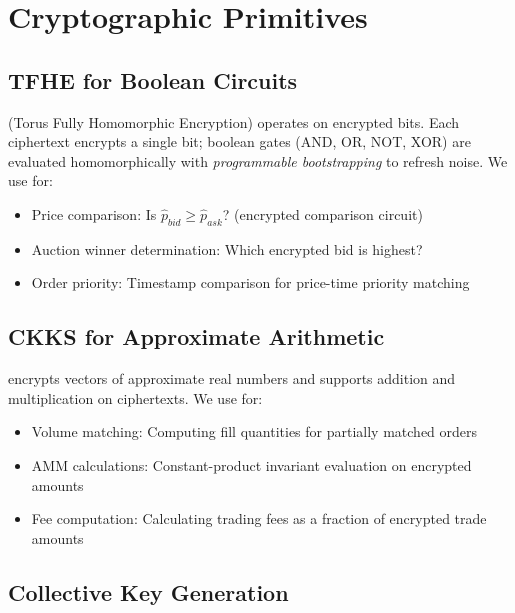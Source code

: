 \section{Cryptographic Primitives}

\label{sec:primitives}

\subsection{TFHE for Boolean Circuits}

\TFHE{} (Torus Fully Homomorphic Encryption) \cite{chillotti2020tfhe} operates on encrypted bits. Each ciphertext encrypts a single bit; boolean gates (AND, OR, NOT, XOR) are evaluated homomorphically with \emph{programmable bootstrapping} to refresh noise. We use \TFHE{} for:

\begin{itemize}
    \item Price comparison: Is $\hat{p}_{\textit{bid}} \geq \hat{p}_{\textit{ask}}$? (encrypted comparison circuit)
    \item Auction winner determination: Which encrypted bid is highest?
    \item Order priority: Timestamp comparison for price-time priority matching
\end{itemize}

\subsection{CKKS for Approximate Arithmetic}

\CKKS{} \cite{cheon2017ckks} encrypts vectors of approximate real numbers and supports addition and multiplication on ciphertexts. We use \CKKS{} for:

\begin{itemize}
    \item Volume matching: Computing fill quantities for partially matched orders
    \item AMM calculations: Constant-product invariant evaluation on encrypted amounts
    \item Fee computation: Calculating trading fees as a fraction of encrypted trade amounts
\end{itemize}

\subsection{Collective Key Generation}

